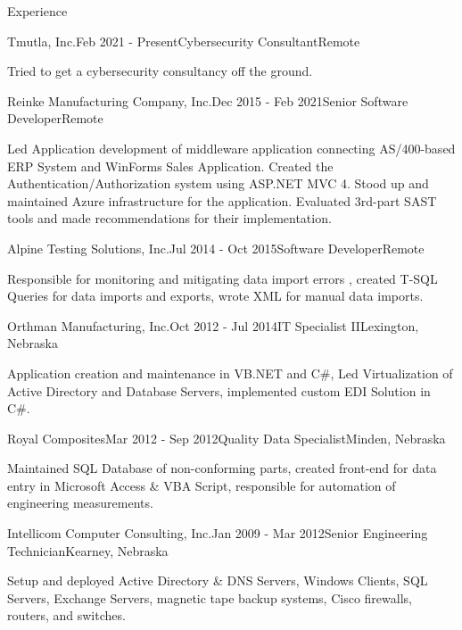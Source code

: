 \documentclass{resume} %
\begin{document}

\begin{rSection}{Experience}

\begin{rSubsection}{Tmutla, Inc.}{Feb 2021 - Present}{Cybersecurity Consultant}{Remote}
\item Tried to get a cybersecurity consultancy off the ground.
\end{rSubsection}

\begin{rSubsection}{Reinke Manufacturing Company, Inc.}{Dec 2015 - Feb 2021}{Senior Software Developer}{Remote} 
\item Led Application development of middleware application connecting AS/400-based ERP System and WinForms Sales Application. Created the Authentication/Authorization system using ASP.NET MVC 4. Stood up and maintained Azure infrastructure for the application. Evaluated 3rd-part SAST tools and made recommendations for their implementation.
\end{rSubsection}

\begin{rSubsection}{Alpine Testing Solutions, Inc.}{Jul 2014 - Oct 2015}{Software Developer}{Remote}
\item Responsible for monitoring and mitigating data import errors , created T-SQL Queries for data imports and exports, wrote XML for manual data imports.
\end{rSubsection}

\begin{rSubsection}{Orthman Manufacturing, Inc.}{Oct 2012 - Jul 2014}{IT Specialist II}{Lexington, Nebraska}
\item Application creation and maintenance in VB.NET and C\#, Led Virtualization of Active Directory and Database Servers, implemented custom EDI Solution in C\#.
\end{rSubsection}

\begin{rSubsection}{Royal Composites}{Mar 2012 - Sep 2012}{Quality Data Specialist}{Minden, Nebraska}
\item Maintained SQL Database of non-conforming parts, created front-end for data entry in Microsoft Access \& VBA Script, responsible for automation of engineering measurements.
\end{rSubsection}

\begin{rSubsection}{Intellicom Computer Consulting, Inc.}{Jan 2009 - Mar 2012}{Senior Engineering Technician}{Kearney, Nebraska}
\item Setup and deployed Active Directory \& DNS Servers, Windows Clients, SQL Servers, Exchange Servers, magnetic tape backup systems,  Cisco firewalls, routers, and switches.
\end{rSubsection}

\end{rSection}
\end{document}
